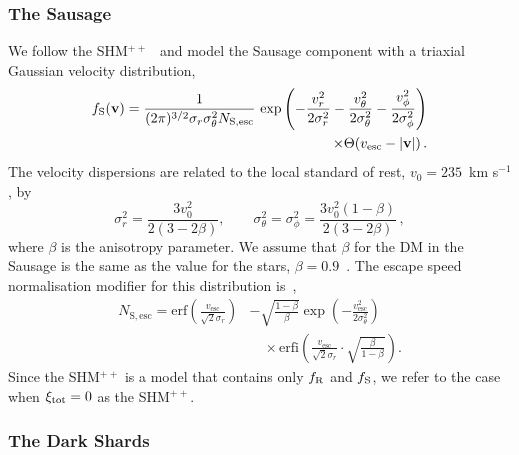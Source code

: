 \documentclass[prd,10pt,twocolumn,showpacs,nofootinbib,aps,superscriptaddress,preprintnumbers]{revtex4-1}
\newcommand{\vesc}{v_\mathrm{esc}}
\newcommand{\erf}{\mathrm{erf}}
\newcommand{\erfi}{\mathrm{erfi}}
\newcommand{\vbf}{\mathbf{v}}
\newcommand{\fR}{f_{\rm R}}
\newcommand{\fS}{f_{\rm S}}
\newcommand{\SHMpp}{SHM$^{++}$\xspace}
\begin{document}
\subsubsection{The Sausage}
%
We follow the \SHMpp~\cite{Evans:2018bqy} and model the Sausage component with a triaxial Gaussian velocity distribution,
%
\begin{align}\label{eq:sausage}
\fS(\vbf) =
\frac{1}{(2\pi)^{3/2}\sigma_r\sigma_\theta^2 N_\mathrm{S,esc}}
\, \exp \left( - \frac{v_r^2}{2\sigma_r^2}
-\frac{v_\theta^2}{2\sigma_\theta^2}- \frac{v_\phi^2}{2\sigma_\phi^2}
\right) \nonumber\\ \times \Theta (\vesc - |\vbf|)\, .
\end{align}
%
The velocity dispersions are related to the local standard of rest, $v_0 =235$~km \!s$^{-1}$, by~\citep{Ev97}
%
\begin{equation}\label{eq:disps}
  \sigma_r^2 = \frac{3v_0^2}{2(3-2\beta)},\qquad\sigma_\theta^2 =
  \sigma_\phi^2 = \frac{3 v_0^2(1-\beta)}{2(3-2\beta)}\, ,
\end{equation}
%
where $\beta$ is the anisotropy parameter. We
assume that $\beta$ for the DM in the Sausage is the
same as the value for the stars, $\beta =
0.9$~\cite{Be18,My18}. The escape speed normalisation modifier for this distribution is~\cite{Evans:2018bqy},
%
\begin{equation}
\begin{split}
N_\mathrm{S,esc} = \erf \left( \frac{\vesc}{\sqrt{2}\sigma_r}\right) &-
\sqrt{\frac{1-\beta}{\beta}}
\exp \left(-\frac{\vesc^2}{2\sigma_\theta^2} \right) \\
&\quad \times \erfi \left( \frac{\vesc}{\sqrt{2}\sigma_r} \cdot \sqrt{\frac{\beta}{1-\beta}}  \right).
\end{split}
\end{equation}
%
Since the \SHMpp is a model that contains only $\fR$ and $\fS$, we refer to the case when $\xi_{\rm tot} =
0$ as the \SHMpp.


  \subsubsection{The Dark Shards}
\end{document}
